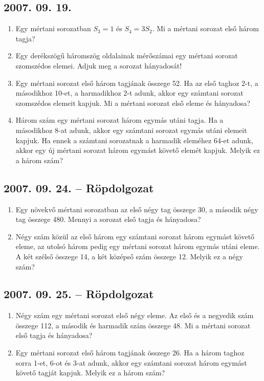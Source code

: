 \documentclass{article}
\begin{document}
\subsection*{2007. 09. 19.}
\begin{enumerate}
\item Egy mértani sorozatban $S_3=1$ és $S_4=3S_2$. Mi a mértani sorozat első három tagja?
\item Egy derékszögű háromszög oldalainak mérőszámai egy mértani sorozat szomszédos elemei. Adjuk meg a sorozat hányadosát!
\item Egy mértani sorozat első három tagjának összege 52. Ha az első taghoz 2-t, a másodikhoz 10-et, a harmadikhoz 2-t adunk, akkor egy számtani sorozat szomszédos elemeit kapjuk. Mi a mértani sorozat első eleme és hányadosa?
\item Három szám egy mértani sorozat három egymás utáni tagja. Ha a másodikhoz 8-at adunk, akkor egy számtani sorozat egymás utáni elemeit kapjuk. Ha ennek a számtani sorozatnak a harmadik eleméhez 64-et adunk, akkor egy új mértani sorozat három egymást követő elemét kapjuk. Melyik ez a három szám?
\end{enumerate}

\subsection*{2007. 09. 24. -- Röpdolgozat}
\begin{enumerate}
\item Egy növekvő mértani sorozatban az első négy tag összege 30, a második négy tag összege 480. Mennyi a sorozat 
első tagja és hányadosa?
\item Négy szám közül az első három egy számtani sorozat három egymást követő eleme, az utolsó három pedig egy mértani sorozat
három egymás utáni eleme. A két szélső összege 14, a két középső szám összege 12. Melyik ez a négy szám?
\end{enumerate}

\subsection*{2007. 09. 25. -- Röpdolgozat}
\begin{enumerate}
\item Négy szám egy mértani sorozat első négy eleme. Az első és a negyedik szám összege 112, a második és harmadik szám összege 48. Mi a mértani sorozat első tagja és hányadosa?
\item Egy mértani sorozat első három tagjának összege 26. Ha a három taghoz sorra 1-et, 6-ot és 3-at adunk, akkor egy számtani
sorozat három egymást követő tagját kapjuk. Melyik ez a három szám?
\end{enumerate}
\end{document}
